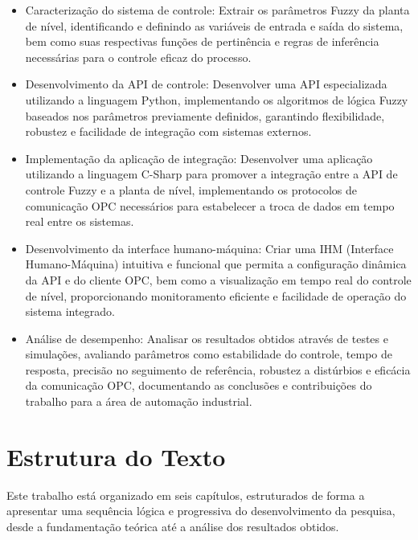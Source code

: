 \begin{itemize}
\item Caracterização do sistema de controle: Extrair os parâmetros Fuzzy da planta de nível, identificando e definindo as variáveis de entrada e saída do sistema, bem como suas respectivas funções de pertinência e regras de inferência necessárias para o controle eficaz do processo.
\item Desenvolvimento da API de controle: Desenvolver uma API especializada utilizando a linguagem Python, implementando os algoritmos de lógica Fuzzy baseados nos parâmetros previamente definidos, garantindo flexibilidade, robustez e facilidade de integração com sistemas externos.
\item Implementação da aplicação de integração: Desenvolver uma aplicação utilizando a linguagem C-Sharp para promover a integração entre a API de controle Fuzzy e a planta de nível, implementando os protocolos de comunicação OPC necessários para estabelecer a troca de dados em tempo real entre os sistemas.
\item Desenvolvimento da interface humano-máquina: Criar uma IHM (Interface Humano-Máquina) intuitiva e funcional que permita a configuração dinâmica da API e do cliente OPC, bem como a visualização em tempo real do controle de nível, proporcionando monitoramento eficiente e facilidade de operação do sistema integrado.
\item Análise de desempenho: Analisar os resultados obtidos através de testes e simulações, avaliando parâmetros como estabilidade do controle, tempo de resposta, precisão no seguimento de referência, robustez a distúrbios e eficácia da comunicação OPC, documentando as conclusões e contribuições do trabalho para a área de automação industrial.
\end{itemize}

\section{Estrutura do Texto}
Este trabalho está organizado em seis capítulos, estruturados de forma a apresentar uma sequência lógica e progressiva do desenvolvimento da pesquisa, desde a fundamentação teórica até a análise dos resultados obtidos.

